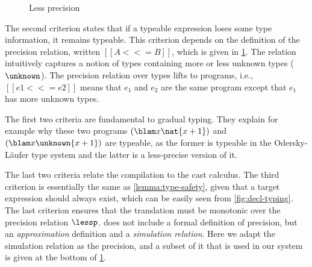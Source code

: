 \begin{figure}[t]
\begin{small}


\end{small}
\caption{Less precision}
\label{fig:lessp}
\end{figure}



The second criterion states that if a typeable expression loses some type
information, it remains typeable. This criterion depends on the definition of
the precision relation, written $[[ A <<= B ]]$, which is given in \cref{fig:lessp}.
The relation intuitively captures a notion of types containing more or less
unknown types ($\unknown$). The precision relation over types lifts to programs,
i.e., $[[ e1 <<= e2  ]]$ means that $e_1$ and $e_2$ are the same program except
that $e_1$ has more unknown types.

The first two criteria are fundamental to gradual typing. They explain for
example why these two programs $(\blam x \nat {x + 1})$ and $(\blam x \unknown
{x + 1})$ are typeable, as the former is typeable in the Odersky-L{\"a}ufer type
system and the latter is a less-precise version of it.

The last two criteria relate the compilation to the cast calculus. The third
criterion is essentially the same as \cref{lemma:type-safety}, given that a
target expression should always exist, which can be easily seen from
\cref{fig:decl-typing}. The last criterion ensures that the translation must be
monotonic over the precision relation $\lessp$. \citet{ahmed2011blame} does not
include a formal definition of precision, but an \emph{approximation}
definition and a \emph{simulation relation}. Here we adapt the simulation
relation as the precision, and a subset of it that is used in our system
is given at the bottom of \cref{fig:lessp}.


